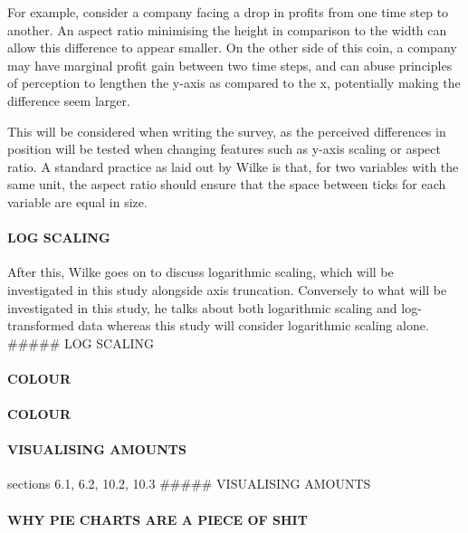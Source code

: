 \documentclass[
  12pt,
]{book}
\begin{document}
For example, consider a company facing a drop in profits from one time
step to another. An aspect ratio minimising the height in comparison to
the width can allow this difference to appear smaller. On the other side
of this coin, a company may have marginal profit gain between two time
steps, and can abuse principles of perception to lengthen the y-axis as
compared to the x, potentially making the difference seem larger.

This will be considered when writing the survey, as the perceived
differences in position will be tested when changing features such as
y-axis scaling or aspect ratio. A standard practice as laid out by Wilke
is that, for two variables with the same unit, the aspect ratio should
ensure that the space between ticks for each variable are equal in size.

\hypertarget{log-scaling}{%
\paragraph{LOG SCALING}\label{log-scaling}}

After this, Wilke goes on to discuss logarithmic scaling, which will be
investigated in this study alongside axis truncation. Conversely to what
will be investigated in this study, he talks about both logarithmic
scaling and log-transformed data whereas this study will consider
logarithmic scaling alone. \#\#\#\#\# LOG SCALING

\hypertarget{colour}{%
\paragraph{COLOUR}\label{colour}}

\hypertarget{colour-1}{%
\paragraph{COLOUR}\label{colour-1}}

\hypertarget{visualising-amounts}{%
\paragraph{VISUALISING AMOUNTS}\label{visualising-amounts}}

\citet{wilke2910} sections 6.1, 6.2, 10.2, 10.3 \#\#\#\#\# VISUALISING
AMOUNTS

\hypertarget{why-pie-charts-are-a-piece-of-shit}{%
\paragraph{WHY PIE CHARTS ARE A PIECE OF
SHIT}\label{why-pie-charts-are-a-piece-of-shit}}
\end{document}
